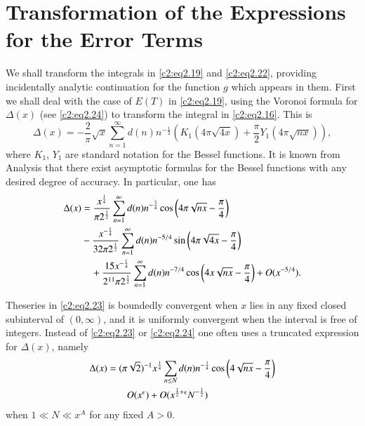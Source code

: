 \section{Transformation of the Expressions for the Error
  Terms}\label{c2:sec2.3} 

We shall transform the integrals in \eqref{c2:eq2.19} and
\eqref{c2:eq2.22}, providing incidentally analytic continuation for
the function $g$ which appears in them. First we shall deal with the
case of $E(T)$ in \eqref{c2:eq2.19}, using the Voronoi formula for
$\Delta  (x)$ (see \eqref{c2:eq2.24}) to transform the integral in
\eqref{c2:eq2.16}. This is 
\begin{equation}
  \Delta  (x) =- \frac{2}{\pi} \sqrt{x} \sum_{n=1}^\infty d(n)
  n^{- \frac{1}{2}} \left(K_1 (4 \pi \sqrt{4x}) + \frac{\pi}{2} Y_1 (4 \pi
  \sqrt{n x})\right), \label{c2:eq2.23}
\end{equation}
where $K_1$, $Y_1$ are standard notation for the Bessel functions. It
is known from Analysis that there exist asymptotic formulas for the
Bessel functions with any desired degree of accuracy. In particular,
one has
\begin{align}
  \Delta  (x) & = \frac{x^{\frac{1}{4}}}{\pi 2^{\frac{1}{2}}}
  \sum^\infty_{n=1} d(n) n^{-\frac{3}{4}} \cos \left(4 \pi \sqrt{n x} -
  \frac{\pi}{4}\right) \label{c2:eq2.24}\\
  & - \frac{x^{-\frac{1}{4}}}{32 \pi 2^{\frac{1}{2}}}
  \sum^\infty_{n=1} d(n) n^{-5/4} \sin \left(4 \pi \sqrt{4 x} -
  \frac{\pi}{4}  \right)\notag\\ 
  & \quad + \frac{15 x^{- \frac{1}{4}}}{2^{11} \pi
    2^{\frac{1}{2}}} \sum^\infty_{n=1} d(n) n^{- 7/4} \cos \left(4x
  \sqrt{nx} - \frac{\pi}{4} \right)+ O(x^{- 5/4}).\notag 
\end{align}

The\pageoriginale series in \eqref{c2:eq2.23} is boundedly convergent when $x$ lies
in any fixed closed subinterval of $(0 , \infty)$, and it is uniformly
convergent when the interval is free of integers. Instead of
\eqref{c2:eq2.23} or \eqref{c2:eq2.24} one often uses a truncated
expression for $\Delta  (x)$, namely
\begin{align}
  \Delta  (x)  & = (\pi \sqrt{2})^{-1} x^{\frac{1}{4}} \sum_{n \leq
    N}d(n) n^{- \frac{1}{4}} \cos \left(4 \sqrt{nx}-
  \frac{\pi}{4}\right)\notag\\
  & \qquad O(x^\epsilon) + O(x^{\frac{1}{2} + \epsilon} N^{-
    \frac{1}{2}})\label{c2:eq2.25} 
\end{align}
when  $1 \ll N \ll x^A$ for any fixed $A > 0$.

